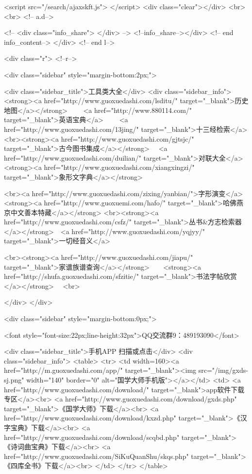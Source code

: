 <script src="/search/ajaxskft.js"> </script>
 <div class="clear"></div>
<br>
<br>
 <!-- a.d-->

 <!--
<div class="info_share">
</div> 
-->
 <!--info_share--></div>   <!-- end info_content-->
  </div> <!-- end l-->

<div class="r">   <!--r-->



<div class="sidebar"  style="margin-bottom:2px;">

 
<div class="sidebar_title">工具类大全</div>
<div class="sidebar_info">
<strong><a href="http://www.guoxuedashi.com/lsditu/" target="_blank">历史地图</a></strong>　　
<a href="http://www.880114.com/" target="_blank">英语宝典</a>　　
<a href="http://www.guoxuedashi.com/13jing/" target="_blank">十三经检索</a>　
<br><strong><a href="http://www.guoxuedashi.com/gjtsjc/" target="_blank">古今图书集成</a></strong>　
<a href="http://www.guoxuedashi.com/duilian/" target="_blank">对联大全</a>　<strong><a href="http://www.guoxuedashi.com/xiangxingzi/" target="_blank">象形文字典</a></strong>　

<br><a href="http://www.guoxuedashi.com/zixing/yanbian/">字形演变</a>　　<strong><a href="http://www.guoxuemi.com/hafo/" target="_blank">哈佛燕京中文善本特藏</a></strong>
<br><strong><a href="http://www.guoxuedashi.com/csfz/" target="_blank">丛书&方志检索器</a></strong>　<a href="http://www.guoxuedashi.com/yqjyy/" target="_blank">一切经音义</a>　　

<br><strong><a href="http://www.guoxuedashi.com/jiapu/" target="_blank">家谱族谱查询</a></strong>　　<strong><a href="http://shufa.guoxuedashi.com/sfzitie/" target="_blank">书法字帖欣赏</a></strong>　
<br>

</div>
</div>


<div class="sidebar" style="margin-bottom:0px;">

<font style="font-size:22px;line-height:32px">QQ交流群9：489193090</font>


<div class="sidebar_title">手机APP 扫描或点击</div>
<div class="sidebar_info">
<table>
<tr>
	<td width=160><a href="http://m.guoxuedashi.com/app/" target="_blank"><img src="/img/gxds-sj.png" width="140"  border="0" alt="国学大师手机版"></a></td>
	<td>
<a href="http://www.guoxuedashi.com/download/" target="_blank">app软件下载专区</a><br>
<a href="http://www.guoxuedashi.com/download/gxds.php" target="_blank">《国学大师》下载</a><br>
<a href="http://www.guoxuedashi.com/download/kxzd.php" target="_blank">《汉字宝典》下载</a><br>
<a href="http://www.guoxuedashi.com/download/scqbd.php" target="_blank">《诗词曲宝典》下载</a><br>
<a href="http://www.guoxuedashi.com/SiKuQuanShu/skqs.php" target="_blank">《四库全书》下载</a><br>
</td>
</tr>
</table>

